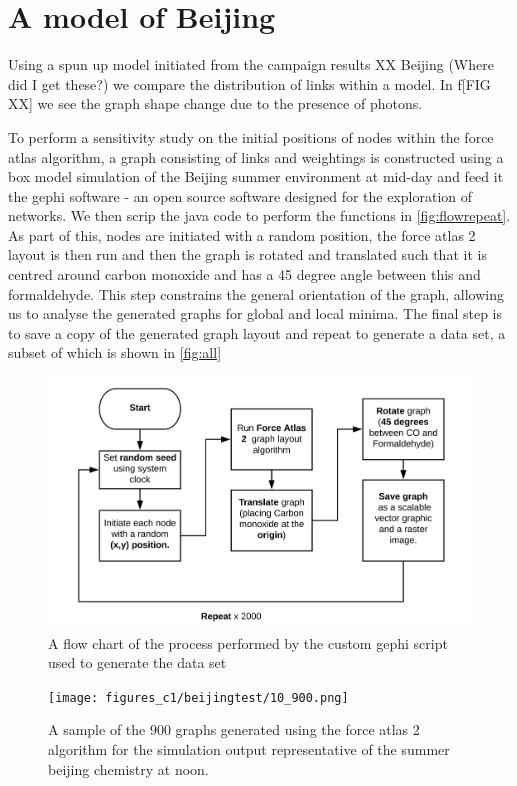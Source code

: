 \section{A model of Beijing}
Using a spun up model initiated from the campaign results XX Beijing (Where did I get these?) we compare the distribution of links within a model. In f[FIG XX] we see the graph shape change due to the presence of photons. 


To perform a sensitivity study on the initial positions of nodes within the force atlas algorithm, a graph consisting of links and weightings is constructed using a box model simulation of the Beijing summer environment at mid-day and feed it the gephi software \citep{gephi} - an open source software designed for the exploration of networks. We then scrip the java code to perform the functions in \autoref{fig:flowrepeat}. As part of this, nodes are initiated with a random position, the force atlas 2 layout is then run and then the graph is rotated and translated such that it is centred around carbon monoxide and has a 45 degree angle between this and formaldehyde. This step constrains the general orientation of the graph, allowing us to analyse the generated graphs for global and local minima. The final step is to save a copy of the generated graph layout and repeat to generate a data set, a subset of which is shown in  \autoref{fig:all}

    \begin{figure}[H]
         \centering
     \includegraphics[width=\textwidth]{figures_c1/flowrepeat.png}
     \caption{ A flow chart of the process performed by the custom gephi script used to generate the data set}
     \label{fig:flowrepeat}
     \end{figure}
 
    \begin{figure}[H]
         \centering
     \texttt{[image: figures\_c1/beijingtest/10\_900.png]}
     \caption{A sample of the 900 graphs generated using the force atlas 2 algorithm for the simulation output representative of the summer beijing chemistry at noon.  }
     \label{fig:all}
     \end{figure}
 

